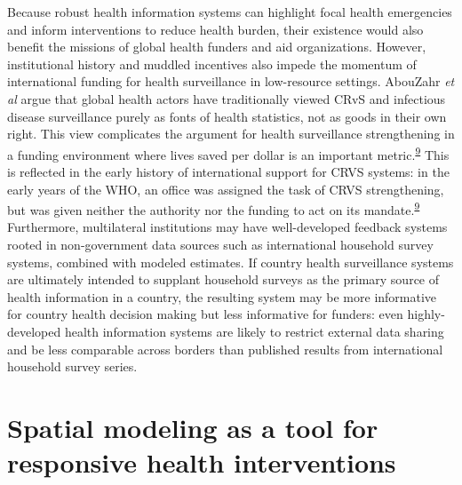 \documentclass[
]{article}
\begin{document}
Because robust health information systems can highlight focal health emergencies and inform interventions to reduce health burden, their existence would also benefit the missions of global health funders and aid organizations. However, institutional history and muddled incentives also impede the momentum of international funding for health surveillance in low-resource settings. AbouZahr \emph{et al} argue that global health actors have traditionally viewed CRvS and infectious disease surveillance purely as fonts of health statistics, not as goods in their own right. This view complicates the argument for health surveillance strengthening in a funding environment where lives saved per dollar is an important metric.\textsuperscript{\protect\hyperlink{ref-AbouZahr2015}{9}} This is reflected in the early history of international support for CRVS systems: in the early years of the WHO, an office was assigned the task of CRVS strengthening, but was given neither the authority nor the funding to act on its mandate.\textsuperscript{\protect\hyperlink{ref-AbouZahr2015}{9}} Furthermore, multilateral institutions may have well-developed feedback systems rooted in non-government data sources such as international household survey systems, combined with modeled estimates. If country health surveillance systems are ultimately intended to supplant household surveys as the primary source of health information in a country, the resulting system may be more informative for country health decision making but less informative for funders: even highly-developed health information systems are likely to restrict external data sharing and be less comparable across borders than published results from international household survey series.

\hypertarget{spatial-modeling-as-a-tool-for-responsive-health-interventions}{%
\section{Spatial modeling as a tool for responsive health interventions}\label{spatial-modeling-as-a-tool-for-responsive-health-interventions}}
\end{document}
